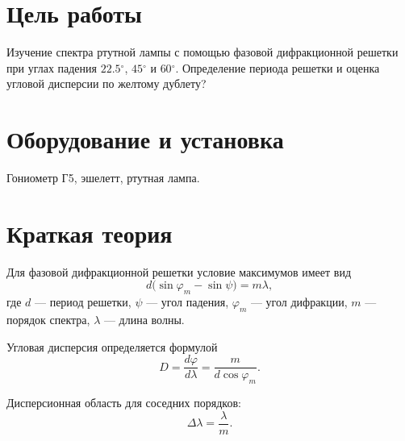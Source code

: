 \documentclass[twoside]{mfitjournal}
\newcommand{\degree}{\ensuremath{^\circ}}
\begin{document}
\author{Иванов Е.\,С.}

\makeatletter
\renewcommand{\tit}{}
\renewcommand{\@oddhead}{}
\renewcommand{\@evenhead}{}
\makeatother

\pagestyle{fancy}
\fancyhf{}

\maketitle

\section*{Цель работы}
Изучение спектра ртутной лампы с помощью фазовой дифракционной решетки при углах падения $22.5\degree$, $45\degree$ и $60\degree$. Определение периода решетки и оценка угловой дисперсии по желтому дублету?

\section*{Оборудование и установка}
Гониометр Г5, эшелетт, ртутная лампа.

\section*{Краткая теория}
Для фазовой дифракционной решетки условие максимумов имеет вид
\begin{equation}
d\bigl(\sin\varphi_m-\sin\psi\bigr)=m\lambda,
\label{eq:grating}
\end{equation}
где $d$ --- период решетки, $\psi$ --- угол падения, $\varphi_m$ --- угол дифракции, $m$ --- порядок спектра, $\lambda$ --- длина волны.

Угловая дисперсия определяется формулой
\begin{equation}
D=\frac{d\varphi}{d\lambda}=\frac{m}{d\cos\varphi_m}.
\label{eq:dispersion}
\end{equation}

Дисперсионная область для соседних порядков:
\begin{equation}
\Delta\lambda=\frac{\lambda}{m}.
\label{eq:interval}
\end{equation}
\end{document}
